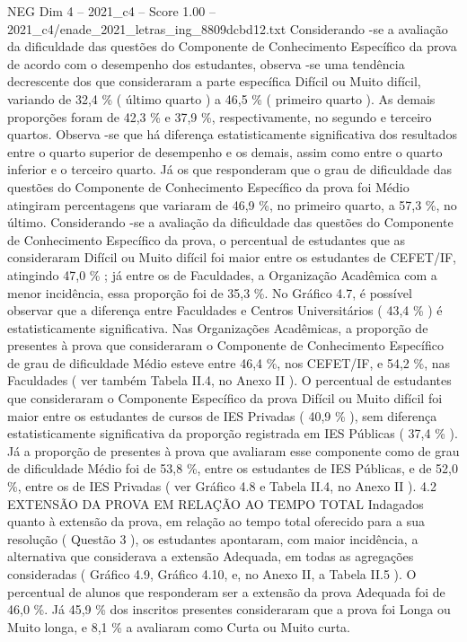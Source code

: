 \begin{textsample}{NEG Dim 4 – 2021\_c4 – Score 1.00 – 2021\_c4/enade\_2021\_letras\_ing\_8809dcbd12.txt}
Considerando -se a avaliação da dificuldade das questões do Componente de Conhecimento Específico da prova de acordo com o desempenho dos estudantes, observa -se uma tendência decrescente dos que consideraram a parte específica Difícil ou Muito difícil, variando de 32,4 \% ( último quarto ) a 46,5 \% ( primeiro quarto ).
As demais proporções foram de 42,3 \% e 37,9 \%, respectivamente, no segundo e terceiro quartos.
Observa -se que há diferença estatisticamente significativa dos resultados entre o quarto superior de desempenho e os demais, assim como entre o quarto inferior e o terceiro quarto.
Já os que responderam que o grau de dificuldade das questões do Componente de Conhecimento Específico da prova foi Médio atingiram percentagens que variaram de 46,9 \%, no primeiro quarto, a 57,3 \%, no último.
Considerando -se a avaliação da dificuldade das questões do Componente de Conhecimento Específico da prova, o percentual de estudantes que as consideraram Difícil ou Muito difícil foi maior entre os estudantes de CEFET/IF, atingindo 47,0 \% ; já entre os de Faculdades, a Organização Acadêmica com a menor incidência, essa proporção foi de 35,3 \%.
No Gráfico 4.7, é possível observar que a diferença entre Faculdades e Centros Universitários ( 43,4 \% ) é estatisticamente significativa.
Nas Organizações Acadêmicas, a proporção de presentes à prova que consideraram o Componente de Conhecimento Específico de grau de dificuldade Médio esteve entre 46,4 \%, nos CEFET/IF, e 54,2 \%, nas Faculdades ( ver também Tabela II.4, no Anexo II ).
O percentual de estudantes que consideraram o Componente Específico da prova Difícil ou Muito difícil foi maior entre os estudantes de cursos de IES Privadas ( 40,9 \% ), sem diferença estatisticamente significativa da proporção registrada em IES Públicas ( 37,4 \% ).
Já a proporção de presentes à prova que avaliaram esse componente como de grau de dificuldade Médio foi de 53,8 \%, entre os estudantes de IES Públicas, e de 52,0 \%, entre os de IES Privadas ( ver Gráfico 4.8 e Tabela II.4, no Anexo II ). 4.2 EXTENSÃO DA PROVA EM RELAÇÃO AO TEMPO TOTAL Indagados quanto à extensão da prova, em relação ao tempo total oferecido para a sua resolução ( Questão 3 ), os estudantes apontaram, com maior incidência, a alternativa que considerava a extensão Adequada, em todas as agregações consideradas ( Gráfico 4.9, Gráfico 4.10, e, no Anexo II, a Tabela II.5 ).
O percentual de alunos que responderam ser a extensão da prova Adequada foi de 46,0 \%.
Já 45,9 \% dos inscritos presentes consideraram que a prova foi Longa ou Muito longa, e 8,1 \% a avaliaram como Curta ou Muito curta.

\end{textsample}
